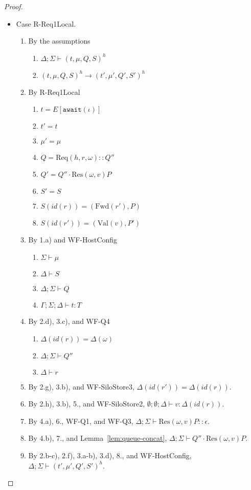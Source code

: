\documentclass{article}
\theoremstyle{definition}
\newcommand{\Req}[3]{\text{Req}(#1, #2, #3)}
\newcommand{\Res}[2]{\text{Res}(#1, #2)}
\newcommand{\Val}[1]{\text{Val}(#1)}
\newcommand{\Fwd}[1]{\text{Fwd}(#1)}
\begin{document}
\begin{proof}
\begin{itemize}
\item Case R-Req1Local.
\begin{enumerate}
\item By the assumptions
  \begin{enumerate}[label=(\alph*)]
  \item $\Delta ; \Sigma \vdash (t, \mu, Q, S)^h$
  \item $(t, \mu, Q, S)^h \longrightarrow (t', \mu', Q', S')^h$
  \end{enumerate}
\item By R-Req1Local
  \begin{enumerate}[label=(\alph*)]
  \item $t = E[\texttt{await}(\iota)]$
  \item $t' = t$
  \item $\mu' = \mu$
  \item $Q = {\Req h r \omega} :: Q''$
  \item $Q' = Q'' \cdot {\Res \omega v P}$
  \item $S' = S$
  \item $S(id(r))  = (\Fwd{r'}, P)$  %
  \item $S(id(r')) = (\Val{v}, P')$
  \end{enumerate}
\item By 1.a) and WF-HostConfig
  \begin{enumerate}[label=(\alph*)]
  \item $\Sigma \vdash \mu$
  \item $\Delta \vdash S$
  \item $\Delta ; \Sigma \vdash Q$
  \item $\Gamma ; \Sigma ; \Delta \vdash t : T$
  \end{enumerate}
\item By 2.d), 3.c), and WF-Q4
  \begin{enumerate}[label=(\alph*)]
  \item $\Delta(id(r)) = \Delta(\omega)$
  \item $\Delta ; \Sigma \vdash Q''$
  \item $\Delta \vdash r$
  \end{enumerate}
\item By 2.g), 3.b), and WF-SiloStore3, $\Delta(id(r')) = \Delta(id(r))$.
\item By 2.h), 3.b), 5., and WF-SiloStore2, $\emptyset ; \emptyset ; \Delta \vdash v : \Delta(id(r))$.
\item By 4.a), 6., WF-Q1, and WF-Q3, $\Delta ; \Sigma \vdash {\Res \omega v P} :: \epsilon$.
\item By 4.b), 7., and Lemma~\ref{lem:queue-concat}, $\Delta ; \Sigma \vdash Q'' \cdot {\Res \omega v P}$.
\item By 2.b-c), 2.f), 3.a-b), 3.d), 8., and WF-HostConfig, $\Delta ; \Sigma \vdash (t', \mu', Q', S')^h$.
\end{enumerate}


\end{itemize}
\end{proof}
\end{document}
